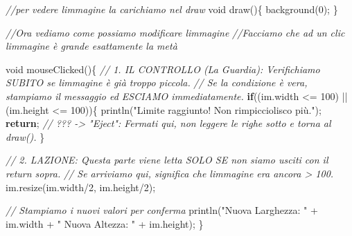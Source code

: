 \documentclass[
]{article}
\newenvironment{Shaded}{}{}
\newcommand{\CommentTok}[1]{\textcolor[rgb]{0.38,0.63,0.69}{\textit{#1}}}
\newcommand{\ControlFlowTok}[1]{\textcolor[rgb]{0.00,0.44,0.13}{\textbf{#1}}}
\newcommand{\DataTypeTok}[1]{\textcolor[rgb]{0.56,0.13,0.00}{#1}}
\newcommand{\DecValTok}[1]{\textcolor[rgb]{0.25,0.63,0.44}{#1}}
\newcommand{\FunctionTok}[1]{\textcolor[rgb]{0.02,0.16,0.49}{#1}}
\newcommand{\NormalTok}[1]{#1}
\newcommand{\OperatorTok}[1]{\textcolor[rgb]{0.40,0.40,0.40}{#1}}
\newcommand{\StringTok}[1]{\textcolor[rgb]{0.25,0.44,0.63}{#1}}
\begin{document}
\begin{Shaded}
\begin{Highlighting}[]
\CommentTok{//per vedere l\textquotesingle{}immagine la carichiamo nel draw}
\DataTypeTok{void} \FunctionTok{draw}\OperatorTok{()\{}
  \FunctionTok{background}\OperatorTok{(}\DecValTok{0}\OperatorTok{);}
\OperatorTok{\}}

\CommentTok{//Ora vediamo come possiamo modificare l\textquotesingle{}immagine}
\CommentTok{//Facciamo che ad un clic l\textquotesingle{}immagine è grande esattamente la metà}

\DataTypeTok{void} \FunctionTok{mouseClicked}\OperatorTok{()\{}
  \CommentTok{// 1. IL CONTROLLO (La Guardia): Verifichiamo SUBITO se l\textquotesingle{}immagine è già troppo piccola.}
  \CommentTok{// Se la condizione è vera, stampiamo il messaggio ed ESCIAMO immediatamente.}
  \ControlFlowTok{if}\OperatorTok{((}\NormalTok{im}\OperatorTok{.}\FunctionTok{width} \OperatorTok{\textless{}=} \DecValTok{100}\OperatorTok{)} \OperatorTok{||} \OperatorTok{(}\NormalTok{im}\OperatorTok{.}\FunctionTok{height} \OperatorTok{\textless{}=} \DecValTok{100}\OperatorTok{))\{}
    \FunctionTok{println}\OperatorTok{(}\StringTok{"Limite raggiunto! Non rimpicciolisco più."}\OperatorTok{);}
    \ControlFlowTok{return}\OperatorTok{;} \CommentTok{// ??? {-}\textgreater{} "Eject": Fermati qui, non leggere le righe sotto e torna al draw().}
  \OperatorTok{\}}

  \CommentTok{// 2. L\textquotesingle{}AZIONE: Questa parte viene letta SOLO SE non siamo usciti con il return sopra.}
  \CommentTok{// Se arriviamo qui, significa che l\textquotesingle{}immagine era ancora \textgreater{} 100.}
\NormalTok{  im}\OperatorTok{.}\FunctionTok{resize}\OperatorTok{(}\NormalTok{im}\OperatorTok{.}\FunctionTok{width}\OperatorTok{/}\DecValTok{2}\OperatorTok{,}\NormalTok{ im}\OperatorTok{.}\FunctionTok{height}\OperatorTok{/}\DecValTok{2}\OperatorTok{);} 

  \CommentTok{// Stampiamo i nuovi valori per conferma}
  \FunctionTok{println}\OperatorTok{(}\StringTok{"Nuova Larghezza: "} \OperatorTok{+}\NormalTok{ im}\OperatorTok{.}\FunctionTok{width} \OperatorTok{+} \StringTok{" Nuova Altezza: "} \OperatorTok{+}\NormalTok{ im}\OperatorTok{.}\FunctionTok{height}\OperatorTok{);}
\OperatorTok{\}}


\end{Highlighting}
\end{Shaded}
\end{document}
